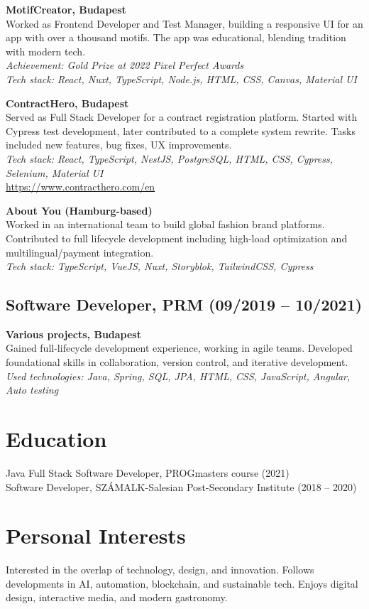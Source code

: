 \documentclass[a4paper,12pt]{article}
\begin{document}
\vspace{0.5em}
\textbf{MotifCreator, Budapest} \\ 
Worked as Frontend Developer and Test Manager, building a responsive UI for an app with over a thousand motifs. The app was educational, blending tradition with modern tech. \\ 
\textit{Achievement: Gold Prize at 2022 Pixel Perfect Awards} \\ 
\textit{Tech stack: React, Nuxt, TypeScript, Node.js, HTML, CSS, Canvas, Material UI}

\vspace{0.5em}
\textbf{ContractHero, Budapest} \\ 
Served as Full Stack Developer for a contract registration platform. Started with Cypress test development, later contributed to a complete system rewrite. Tasks included new features, bug fixes, UX improvements. \\ 
\textit{Tech stack: React, TypeScript, NestJS, PostgreSQL, HTML, CSS, Cypress, Selenium, Material UI} \\ 
\url{https://www.contracthero.com/en}

\pagebreak[0]

\vspace{0.5em}
\textbf{About You (Hamburg-based)} \\ 
Worked in an international team to build global fashion brand platforms. Contributed to full lifecycle development including high-load optimization and multilingual/payment integration. \\ 
\textit{Tech stack: TypeScript, VueJS, Nuxt, Storyblok, TailwindCSS, Cypress}

\subsection*{Software Developer, PRM (09/2019 -- 10/2021)}
\textbf{Various projects, Budapest} \\ 
Gained full-lifecycle development experience, working in agile teams. Developed foundational skills in collaboration, version control, and iterative development. \\ 
\textit{Used technologies: Java, Spring, SQL, JPA, HTML, CSS, JavaScript, Angular, Auto testing}

\section*{Education}
Java Full Stack Software Developer, PROGmasters course (2021) \\
Software Developer, SZ\'AMALK-Salesian Post-Secondary Institute (2018 -- 2020)

\section*{Personal Interests}
Interested in the overlap of technology, design, and innovation. Follows developments in AI, automation, blockchain, and sustainable tech. Enjoys digital design, interactive media, and modern gastronomy.
\end{document}
